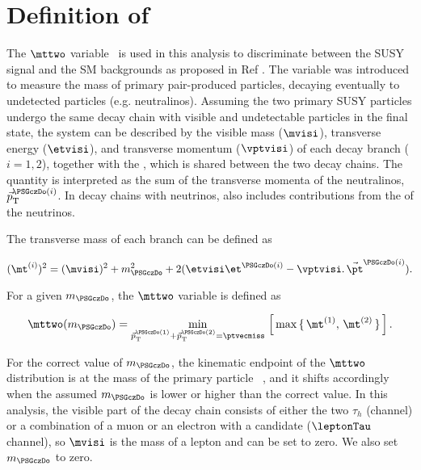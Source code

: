 \section{\texorpdfstring{Definition of \mttwo}{Definition of MT2}}
\label{sect:mt2def}
The $\mttwo$ variable~\cite{Lester:1999tx,Barr:2003rg} is used in this analysis to discriminate between the SUSY signal and the SM backgrounds as proposed in Ref \cite{Barr:2009wu}. The variable was introduced to measure the mass of primary pair-produced particles, decaying eventually to undetected particles (e.g. neutralinos). Assuming the two primary SUSY particles undergo the same decay chain with visible and undetectable particles in the final state, the system can be described by the visible mass ($\mvisi$), transverse energy ($\etvisi$), and transverse momentum ($\vptvisi$) of each decay branch ($i=1,2$), together with the 
\ptvecmiss, which is shared between the two decay chains. The quantity \ptvecmiss is interpreted as the sum of the transverse momenta
of the neutralinos, $\vec{p}_{\rm T}^{\PSGczDo(i)}$.
In decay chains with neutrinos, \ptvecmiss also includes contributions from the \ptvec of the neutrinos.

The transverse mass of each branch can be defined as 
\begin{linenomath}
\begin{equation}
\label{eq:mtdef}
(\mt^{(i)})^{2}= (\mvisi)^2+m^2_{\PSGczDo}+2(\etvisi\et^{\PSGczDo(i)}-{\vptvisi}.\,{\vec{\pt}^{\PSGczDo(i)}}).
\end{equation}
\end{linenomath}

For a given $m_{\PSGczDo}$, the $\mttwo$ variable is defined as
\begin{linenomath}
\begin{equation}
\label{eq:mt2def}
\mttwo(m_{\PSGczDo})=\min_{\vec{p}^{\PSGczDo(1)}_{\rm T}+\vec{p}_{\rm T}^{\PSGczDo(2)}=\ptvecmiss}\,\left[\,\max\,\{ \, \mt^{(1)},\,\mt^{(2)}\,\}\,\right].
\end{equation}
\end{linenomath}

For the correct value of $m_{\PSGczDo}$, the kinematic endpoint of the $\mttwo$ distribution is at the mass of the primary particle ~\cite{Affolder:2000bpa,Abazov:2002bu}, and it shifts accordingly when the assumed $m_{\PSGczDo}$ is lower or higher than the correct value. In this analysis, 
the visible part of the decay chain consists of either the two $\tau_h$ (\tauTau channel)
or a combination of a muon or an electron with a \Tau candidate ($\leptonTau$ channel), so $\mvisi$ is the mass of a lepton and can be set to zero. We also set $m_{\PSGczDo}$ to zero. 


